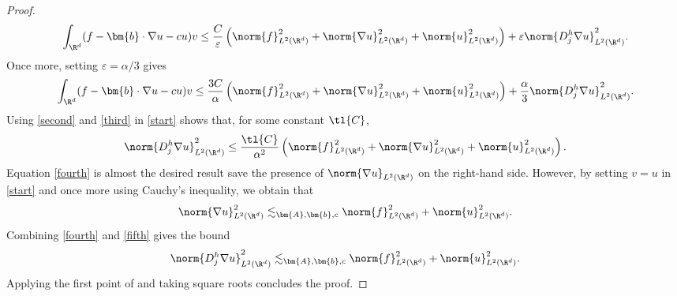 \documentclass[
    a4paper,
    DIV=14,
    abstract=true,
    numbers=noenddot
]{scrartcl}
\begin{document}
\begin{proof}
    \begin{align*}
        \int_{\R^d} (f- \bm{b} \cdot \nabla u -cu)v \leq \frac{C}{\varepsilon }\left(\norm{f}^2_{L^2(\R^d)}+ \norm{\nabla u}^2_{L^2(\R^d)}+\norm{u}^2_{L^2(\R^d)}\right)+\varepsilon \norm{D_j^h \nabla u}_{L^2(\R^d)}^2.
    \end{align*}
    Once more, setting $\varepsilon =\alpha /3$ gives
    \begin{align}\label{third}
        \int_{\R^d} (f- \bm{b} \cdot \nabla u -cu)v \leq \frac{3C}{\alpha }\left(\norm{f}^2_{L^2(\R^d)}+ \norm{\nabla u}^2_{L^2(\R^d)}+\norm{u}^2_{L^2(\R^d)}\right)+\frac{\alpha }{3}\norm{D_j^h \nabla u}_{L^2(\R^d)}^2.
    \end{align}
    Using \eqref{second} and \eqref{third} in \eqref{start} shows that, for some constant $\tl{C}$,
    \begin{align}\label{fourth}
        \norm{D_j^h \nabla u}_{L^2(\R^d)}^2 \leq \frac{\tl{C} }{\alpha^2 }\left(\norm{f}^2_{L^2(\R^d)}+ \norm{\nabla u}^2_{L^2(\R^d)}+\norm{u}^2_{L^2(\R^d)}\right).
    \end{align}
    Equation \eqref{fourth} is almost the desired result save the presence of $\norm{\nabla u}_{L^2(\R^d)}$ on the right-hand side. However, by setting $v= u$ in \eqref{start} and once more using Cauchy's inequality, we obtain that
    \begin{align}\label{fifth}
        \norm{\nabla u}_{L^2(\R^d)}^2 \lesssim_{\bm{A},\bm{b},c} \norm{f}^2_{L^2(\R^d)}+ \norm{ u}^2_{L^2(\R^d)}.
    \end{align}
    Combining \eqref{fourth} and \eqref{fifth} gives the bound
    \begin{align*}
        \norm{D_j^h \nabla u}_{L^2(\R^d)}^2 \lesssim_{\bm{A},\bm{b},c} \norm{f}^2_{L^2(\R^d)}+ \norm{ u}^2_{L^2(\R^d)}.
    \end{align*}
    Applying the first point of  and taking square roots concludes the proof.
\end{proof}
\end{document}
